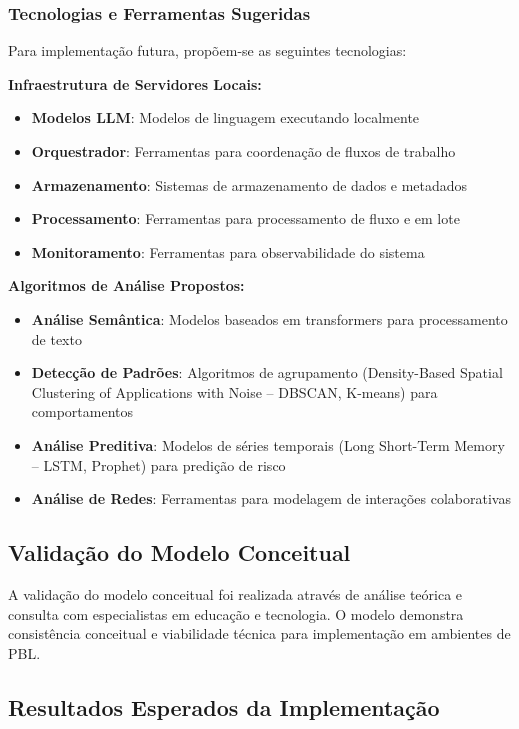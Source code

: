 \documentclass[english, spanish, brazilian]{modelo_dt}
\begin{document}
\subsubsection{Tecnologias e Ferramentas Sugeridas}

Para implementação futura, propõem-se as seguintes tecnologias:

\textbf{Infraestrutura de Servidores Locais:}
\begin{itemize}
\item \textbf{Modelos LLM}: Modelos de linguagem executando localmente
\item \textbf{Orquestrador}: Ferramentas para coordenação de fluxos de trabalho
\item \textbf{Armazenamento}: Sistemas de armazenamento de dados e metadados
\item \textbf{Processamento}: Ferramentas para processamento de fluxo e em lote
\item \textbf{Monitoramento}: Ferramentas para observabilidade do sistema
\end{itemize}

\textbf{Algoritmos de Análise Propostos:}
\begin{itemize}
\item \textbf{Análise Semântica}: Modelos baseados em transformers para processamento de texto
\item \textbf{Detecção de Padrões}: Algoritmos de agrupamento (Density-Based Spatial Clustering of Applications with Noise -- DBSCAN, K-means) para comportamentos
\item \textbf{Análise Preditiva}: Modelos de séries temporais (Long Short-Term Memory -- LSTM, Prophet) para predição de risco
\item \textbf{Análise de Redes}: Ferramentas para modelagem de interações colaborativas
\end{itemize}

\subsection{Validação do Modelo Conceitual}

A validação do modelo conceitual foi realizada através de análise teórica e consulta com especialistas em educação e tecnologia\@. O modelo demonstra consistência conceitual e viabilidade técnica para implementação em ambientes de PBL\@.

\subsection{Resultados Esperados da Implementação}
\end{document}
